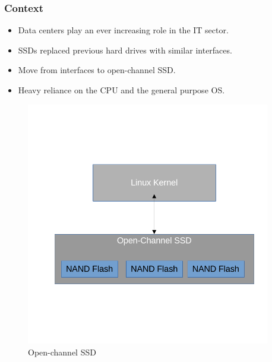 \begin{frame}[hoved]
\frametitle{Context}
\begin{minipage}{0.45\textwidth}
\begin{itemize}
  \item Data centers play an ever increasing role in the IT sector.
  \item SSDs replaced previous hard drives with similar interfaces.
  \item Move from interfaces to open-channel SSD.
  \item Heavy reliance on the CPU and the general purpose OS.
\end{itemize}
\end{minipage}
\hfill
\begin{minipage}{0.45\textwidth}
  \begin{figure}
    \begin{center}
      \includegraphics[width=0.95\textwidth]{figures/openssd.png}
    \end{center}
    \caption{Open-channel SSD}\label{fig:openssd}
  \end{figure}
\end{minipage}
\end{frame}

